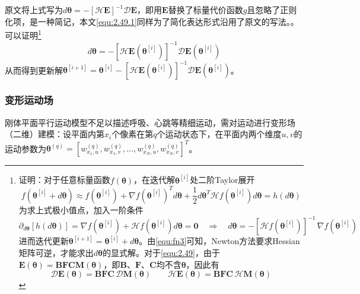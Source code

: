 \documentclass[12pt]{article}
\begin{document}
{原文将上式写为$d\bm{\theta}=-[\mathcal{H}\mathbf{E}]^{-1}\mathcal{D}\mathbf{E}$，即用$\mathbf{E}$替换了标量代价函数$g$且忽略了正则化项，是一种简记，本文\autoref{equ:2.49.1}同样为了简化表达形式沿用了原文的写法。}。可以证明\footnote{证明：对于任意标量函数$f(\bm{\theta})$，在迭代解$\bm{\theta}^{[i]}$处二阶Taylor展开
\begin{equation}
    f(\bm{\theta}^{[i]}+d\bm{\theta})\approx f(\bm{\theta}^{[i]})+\nabla f(\bm{\theta}^{[i]})^T d\bm{\theta}+\frac{1}{2}d\bm{\theta}^T\mathcal{H}f(\bm{\theta}^{[i]}) d\bm{\theta}=h(d\bm{\theta})
\end{equation}
为求上式极小值点，加入一阶条件
\begin{equation}
    \partial_{d\bm{\theta}}\left[h(d\bm{\theta})\right]=\nabla f(\bm{\theta}^{[i]})+\mathcal{H}f(\bm{\theta}^{[i]}) d\bm{\theta}=\bm{0}\quad\Rightarrow\quad
    d\bm{\theta}=-[\mathcal{H}f(\bm{\theta}^{[i]})]^{-1}\,\nabla f(\bm{\theta}^{[i]})
    \label{equ:fn3}
\end{equation}
进而迭代更新$\bm{\theta}^{[i+1]}=\bm{\theta}^{[i]}+d\bm{\theta}$。由\autoref{equ:fn3}可知，Newton方法要求Hessian矩阵可逆，才能求出$d\bm{\theta}$的显式解。对于\autoref{equ:2.49}，由于$\mathbf{E}(\bm{\theta})=\mathbf{B}\mathbf{F}\mathbf{C}\mathbf{M}(\bm{\theta})$，即$\mathbf{B}$、$\mathbf{F}$、$\mathbf{C}$均不含$\bm{\theta}$，因此有
\begin{equation}
    \mathcal{D}\mathbf{E}(\bm{\theta})=\mathbf{B}\mathbf{F}\mathbf{C}\,\mathcal{D}\mathbf{M}(\bm{\theta})
    \qquad
    \mathcal{H}\mathbf{E}(\bm{\theta})=\mathbf{B}\mathbf{F}\mathbf{C}\,\mathcal{H}\mathbf{M}(\bm{\theta})
\end{equation}
\label{footnote:1}}
\begin{equation}
    d\bm{\theta}=-\left[\mathcal{H}\mathbf{E}\left(\bm{\theta}^{[i]}\right)\right]^{-1} \mathcal{D}\mathbf{E}\left(\bm{\theta}^{[i]}\right)
    \label{equ:2.49.1}
\end{equation}
从而得到更新解$\bm{\theta}^{[i+1]}=\bm{\theta}^{[i]}-\left[\mathcal{H}\mathbf{E}\left(\bm{\theta}^{[i]}\right)\right]^{-1}\mathcal{D}\mathbf{E}\left(\bm{\theta}^{[i]}\right)$。

\subsubsection{变形运动场}
刚体平面平行运动模型不足以描述呼吸、心跳等精细运动，需对运动进行变形场（二维）建模：设平面内第$x_i$个像素在第$q$个运动状态下，在平面内两个维度$u,v$的运动参数为$\bm{\theta}^{(q)}=\left[w_{x_1,u}^{(q)},w_{x_1,v}^{(q)},\ldots,w_{x_N,u}^{(q)},w_{x_N,v}^{(q)}\right]^T$。
\end{document}
